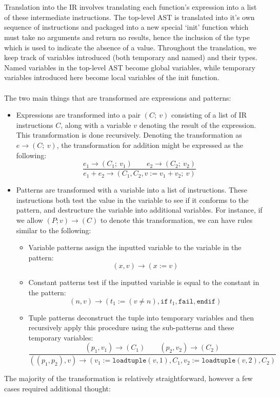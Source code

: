 \\\\
Translation into the IR involves translating each function's expression into a list of these intermediate instructions. The top-level AST is translated into it's own sequence of instructions and packaged into a new special `init' function which must take no arguments and return no results, hence the inclusion of the  type which is used to indicate the absence of a value. Throughout the translation, we keep track of variables introduced (both temporary and named) and their types. Named variables in the top-level AST become global variables, while temporary variables introduced here become local variables of the init function.
\\\\
The two main things that are transformed are expressions and patterns:
\begin{itemize}
    \item Expressions are transformed into a pair $(C;\ v)$ consisting of a list of IR instructions $C$, along with a variable $v$ denoting the result of the expression. This transformation is done recursively. Denoting the transformation as $e \rightarrow (C; \ v)$, the transformation for addition might be expressed as the following:
    $$\dfrac{e_1 \rightarrow (C_1;\ v_1) \qquad e_2 \rightarrow (C_2;\ v_2)}{e_1 + e_2 \rightarrow (C_1,C_2,v := v_1 + v_2;\ v)}$$

    \item Patterns are transformed with a variable into a list of instructions. These instructions both test the value in the variable to see if it conforms to the pattern, and destructure the variable into additional variables. For instance, if we allow $(P; v) \rightarrow (C)$ to denote this transformation, we can have rules similar to the following:
    \begin{itemize}
        \item Variable patterns assign the inputted variable to the variable in the pattern: $$(x, v) \rightarrow (x := v)$$
        \item Constant patterns test if the inputted variable is equal to the constant in the pattern: $$(n, v) \rightarrow (t_1 := (v \neq n), \texttt{if}\ t_1, \texttt{fail}, \texttt{endif})$$
        \item Tuple patterns deconstruct the tuple into temporary variables and then recursively apply this procedure using the sub-patterns and these temporary variables:
        $$\dfrac{(p_1, v_1) \rightarrow (C_1) \qquad (p_2, v_2) \rightarrow (C_2)}{((p_1, p_2), v) \rightarrow (v_1 := \texttt{loadtuple}(v,1), C_1, v_2 := \texttt{loadtuple}(v,2), C_2)}$$
    \end{itemize}
\end{itemize}
The majority of the transformation is relatively straightforward, however a few cases required additional thought:

